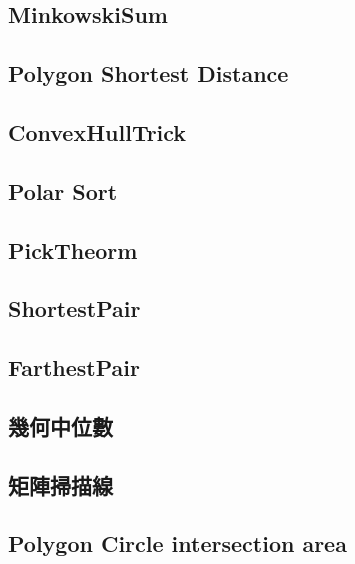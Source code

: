 \subsection{MinkowskiSum}


\subsection{Polygon Shortest Distance}


\subsection{ConvexHullTrick}


\subsection{Polar Sort}


\subsection{PickTheorm}


\subsection{ShortestPair}


\subsection{FarthestPair}


\subsection{幾何中位數}


\subsection{矩陣掃描線}


\subsection{Polygon Circle intersection area}


